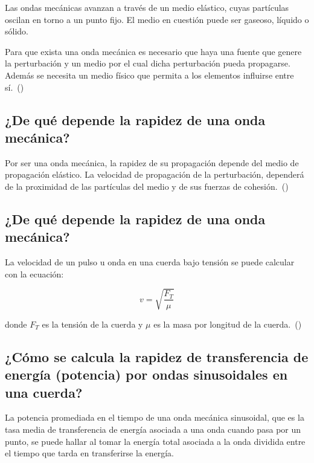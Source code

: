 \documentclass[twocolumn, 12pt]{article}
\begin{document}
Las ondas mecánicas avanzan a través de un medio elástico,
cuyas partículas oscilan en torno a un punto fijo. El medio
en cuestión puede ser gaseoso, líquido o sólido.

Para que exista una onda mecánica es necesario que haya una
fuente que genere la perturbación y un medio por el cual
dicha perturbación pueda propagarse. Además se necesita un
medio físico que permita a los elementos influirse entre
sí.~(\cite{J_Merino_2022})

\subsection{¿De qué depende la rapidez de una onda mecánica?}

Por ser una onda mecánica, la rapidez de su propagación
depende del medio de propagación elástico. La velocidad de
propagación de la perturbación, dependerá de la proximidad
de las partículas del medio y de sus fuerzas de
cohesión.~(\cite{Lasondas})

\subsection{¿De qué depende la rapidez de una onda mecánica?}

La velocidad de un pulso u onda en una cuerda bajo tensión
se puede calcular con la ecuación:

\begin{equation*}
    v = \sqrt{\frac{F_T}{\mu}}
\end{equation*}

donde $F_T$ es la tensión de la cuerda y $\mu$ es la masa
por longitud de la cuerda.~(\cite{Moebs_2021})

\subsection{¿Cómo se calcula la rapidez de transferencia de energía (potencia) por ondas sinusoidales en
    una cuerda?}

La potencia promediada en el tiempo de una onda mecánica
sinusoidal, que es la tasa media de transferencia de
energía asociada a una onda cuando pasa por un punto, se
puede hallar al tomar la energía total asociada a la onda
dividida entre el tiempo que tarda en transferirse la
energía.
\end{document}
